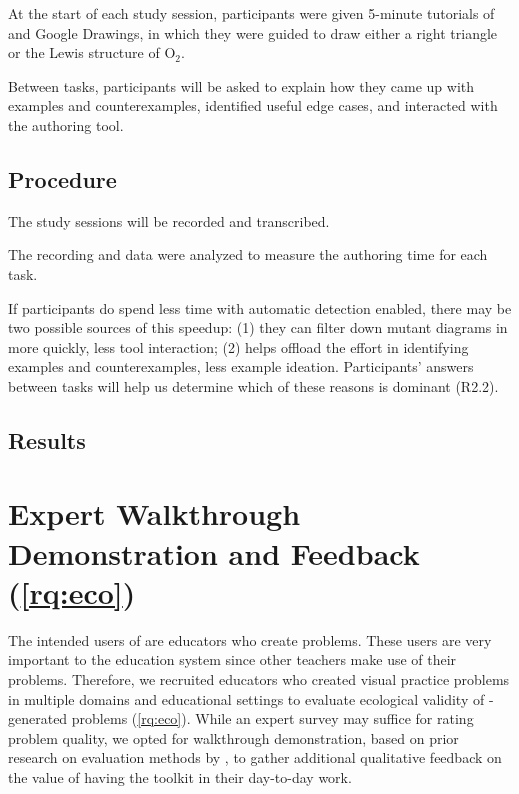 At the start of each study session, participants were given 5-minute tutorials of \Edgeworth and Google Drawings, in which they were guided to draw either a right triangle or the Lewis structure of \ensuremath{\mathrm{O_2}}.

Between tasks, participants will be asked to explain how they came up with examples and counterexamples, identified useful edge cases, and interacted with the authoring tool.

\subsection{Procedure}



The study sessions will be recorded and transcribed. 



The recording and \Edgeworth data were analyzed to measure the authoring time for each task. 

If participants do spend less time with automatic detection enabled, there may be two possible sources of this speedup: (1) they can filter down mutant diagrams in \Edgeworth more quickly, \ie less tool interaction; (2) \Edgeworth helps offload the effort in identifying examples and counterexamples, \ie less example ideation. Participants' answers between tasks will help us determine which of these reasons is dominant (R2.2).

\subsection{Results}



\section{Expert Walkthrough Demonstration and Feedback (\ref{rq:eco})}
\label{sec:expert-feedback}

The intended users of \Edgeworth are educators who create problems. These users are very important to the education system since other teachers make use of their problems. Therefore, we recruited educators who created visual practice problems in multiple domains and educational settings to evaluate ecological validity of \Edgeworth-generated problems (\ref{rq:eco}). While an expert survey may suffice for rating problem quality, we opted for walkthrough demonstration, based on prior research on evaluation methods by \citet{Ledo2018EvaluationResearch}, to gather additional qualitative feedback on the value of having the toolkit in their day-to-day work.


